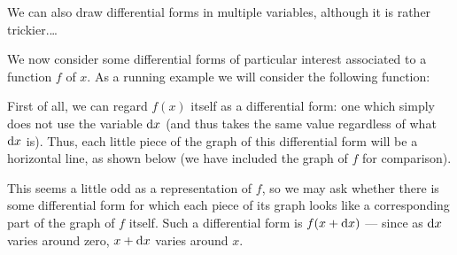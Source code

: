 \documentclass[12pt]{amsart}
\begin{document}
We can also draw differential forms in multiple variables, although it is rather trickier.\dots

We now consider some differential forms of particular interest associated to a function $f$ of $x$.
As a running example we will consider the following function:
\def\axes{
    \draw[<->] (-5,0) -- (5,0);
    \draw[<->] (0,-2) -- (0,2);
    \foreach \x in {1,2,3,4} \draw (\x,.2) -- (\x,-.2);
    \foreach \x in {1,2,3,4} \draw (-\x,.2) -- (-\x,-.2);
}
\def\fctn#1{\draw[#1] (-5,.3) to[out=30,in=170] (-4,1) to[out=-10,in=110] (-2,-1.2) to[out=-70,in=-130] (1,.2) to[out=50,in=120] (5,-.5);}
\def\heights{-4/1cm/-.05,-3/.55cm/-.3,-2/-1.2cm/-.6,-1/-1.5cm/.15,0/-.85cm/.28,1/.2cm/.32,2/.81cm/.08,3/.85cm/-.05,4/.47cm/-.18}
\begin{center}
\end{center}
First of all, we can regard $f(x)$ itself as a differential form: one which simply does not use the variable $\mathrm{d} x$ (and thus takes the same value regardless of what $\mathrm{d} x$ is).
Thus, each little piece of the graph of this differential form will be a horizontal line, as shown below (we have included the graph of $f$ for comparison).
\begin{center}
\end{center}
This seems a little odd as a representation of $f$, so we may ask whether there is some differential form for which each piece of its graph looks like a corresponding part of the graph of $f$ itself.
Such a differential form is $f(x+\mathrm{d} x)$ --- since as $\mathrm{d} x$ varies around zero, $x+\mathrm{d} x$ varies around $x$.
\begin{center}
\end{center}
\end{document}
